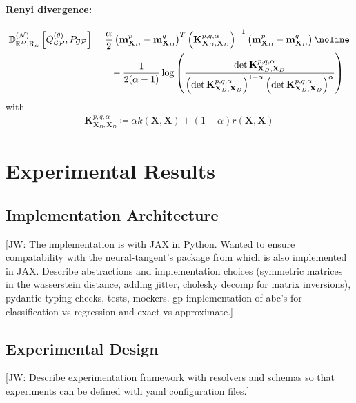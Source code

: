 \documentclass{article}
\newcommand{\jw}[1]{{\color{gray} [JW: #1]}}
\newcommand{\GP}{\operatorname{\mathcal{GP}}}
\numberwithin{equation}{section}
\begin{document}
\paragraph{Renyi divergence:}
\begin{align}
    \mathbb{D}_{\mathbb{R}^D, \text{R}_\alpha}^{(\mathcal{N})} \left[Q_{\GP}^{(\theta)}, P_{\GP}\right] &= \frac{\alpha}{2}\left(\mathbf{m}_{\mathbf{X}_D}^p - \mathbf{m}_{\mathbf{X}_D}^q\right)^T \left(\mathbf{K}_{\mathbf{X}_D, \mathbf{X}_D}^{p, q, \alpha}\right)^{-1}\left(\mathbf{m}_{\mathbf{X}_D}^p - \mathbf{m}_{\mathbf{X}_D}^q\right) \noline \\
    & \qquad - \frac{1}{2(\alpha -1)} \log\left(\frac{\det \mathbf{K}_{\mathbf{X}_D, \mathbf{X}_D}^{p, q, \alpha}}{\left(\det \mathbf{K}_{\mathbf{X}_D, \mathbf{X}_D}^{p, q, \alpha}\right)^{1-\alpha}\left(\det \mathbf{K}_{\mathbf{X}_D, \mathbf{X}_D}^{p, q, \alpha}\right)^{\alpha}}\right)
\end{align}
with
\begin{align}
    \mathbf{K}_{\mathbf{X}_D, \mathbf{X}_D}^{p, q, \alpha} \coloneqq \alpha  k(\mathbf{X}, \mathbf{X}) + (1-\alpha)  r(\mathbf{X}, \mathbf{X})
\end{align}
\newpage
\section{Experimental Results}
\subsection{Implementation Architecture}

\jw{The implementation is with JAX in Python. Wanted to ensure compatability with the neural-tangent's package from \cite{novak2019neural} which is also implemented in JAX. Describe abstractions and implementation choices (symmetric matrices in the wasserstein distance, adding jitter, cholesky decomp for matrix inversions), pydantic typing checks, tests, mockers. gp implementation of abc's for classification vs regression and exact vs approximate.}

\subsection{Experimental Design}
\jw{Describe experimentation framework with resolvers and schemas so that experiments can be defined with yaml configuration files.}
\end{document}
